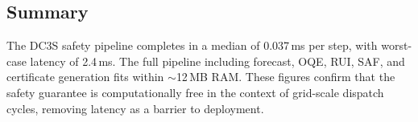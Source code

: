 \subsection{Summary}

The DC3S safety pipeline completes in a median of 0.037\,ms per step,
with worst-case latency of 2.4\,ms.  The full pipeline including
forecast, OQE, RUI, SAF, and certificate generation fits within
$\sim$12\,MB RAM.  These figures confirm that the safety guarantee
is computationally free in the context of grid-scale dispatch cycles,
removing latency as a barrier to deployment.

